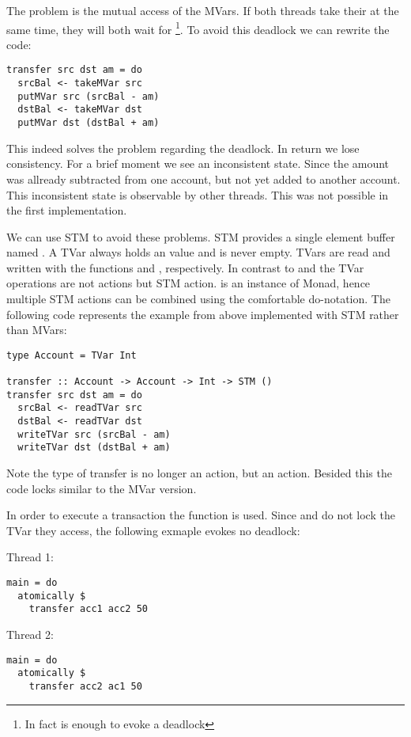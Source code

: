 The problem is the mutual access of the MVars. If both threads take their  at the same time, they will both wait for 
\footnote{In fact is  enough to evoke a deadlock}. To avoid this deadlock we can rewrite the code:
\begin{lstlisting}
transfer src dst am = do
  srcBal <- takeMVar src
  putMVar src (srcBal - am)
  dstBal <- takeMVar dst
  putMVar dst (dstBal + am)
\end{lstlisting}
This indeed solves the problem regarding the deadlock. In return we lose consistency. For a brief moment we see an inconsistent state. Since
the amount was allready subtracted from one account, but not yet added to another account. This inconsistent state is observable by other 
threads. This was not possible in the first implementation. 

We can use STM to avoid these problems. STM provides a single element buffer named . A TVar always holds an value and is never 
empty. TVars are read and written with the functions  and , respectively. 
In contrast to  and  the TVar operations are not  actions but STM action. 
 is an instance of Monad, hence multiple STM actions can be combined
using the comfortable do-notation. The following code represents the example from above implemented with STM rather than MVars:
\begin{lstlisting}
type Account = TVar Int

transfer :: Account -> Account -> Int -> STM ()
transfer src dst am = do
  srcBal <- readTVar src
  dstBal <- readTVar dst
  writeTVar src (srcBal - am)
  writeTVar dst (dstBal + am)
\end{lstlisting}
Note the type of transfer is no longer an  action, but an  action. Besided this the code locks
similar to the MVar version.

In order to execute a transaction the function  is used. 
Since  and  do not lock the TVar they access, the following exmaple evokes no deadlock:
\par\noindent
\begin{minipage}[t]{.45\textwidth}
Thread 1:
\begin{lstlisting}[frame=lrtb]
main = do
  atomically $
    transfer acc1 acc2 50
\end{lstlisting}
\end{minipage}
\hfill
\begin{minipage}[t]{.45\textwidth}
Thread 2:
\begin{lstlisting}[frame=lrtb]
main = do 
  atomically $ 
    transfer acc2 ac1 50
\end{lstlisting}
\end{minipage}

